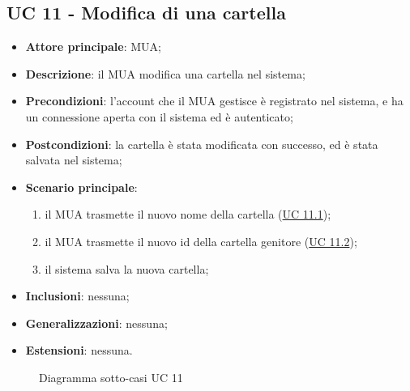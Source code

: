 \subsection{UC 11 - Modifica di una cartella} \label{sec:UC11}
\begin{itemize}
    \item \textbf{Attore principale}: MUA;
    \item \textbf{Descrizione}: il MUA modifica una cartella nel sistema;
    \item \textbf{Precondizioni}: l’account che il MUA gestisce è registrato nel sistema, e ha un connessione aperta con il sistema ed è autenticato;
    \item \textbf{Postcondizioni}: la cartella è stata modificata con successo, ed è stata salvata nel sistema;
    \item \textbf{Scenario principale}:
        \begin{enumerate}
            \item il MUA trasmette il nuovo nome della cartella (\hyperref[sec:UC11.1]{UC 11.1});
            \item il MUA trasmette il nuovo id della cartella genitore (\hyperref[sec:UC11.2]{UC 11.2});
            \item il sistema salva la nuova cartella;
        \end{enumerate}
    \item \textbf{Inclusioni}: nessuna;
    \item \textbf{Generalizzazioni}: nessuna;
    \item \textbf{Estensioni}: nessuna.
\end{itemize}

\begin{figure}[h]
\centering
\caption{Diagramma sotto-casi UC 11}
\end{figure}

